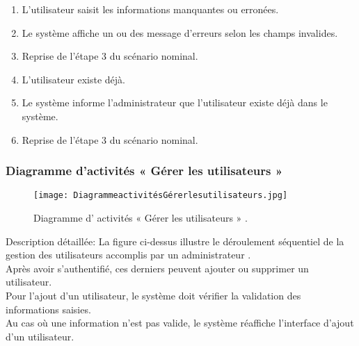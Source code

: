 \begin{itemize}
\begin{itemize}
		\begin{enumerate}
			\item L’utilisateur saisit les informations manquantes ou erronées.
			\item Le système affiche un ou des message d’erreurs selon les champs invalides.
			\item Reprise de l’étape 3 du scénario nominal.
			\item L’utilisateur existe déjà.
			\item Le système informe l’administrateur que l’utilisateur existe déjà dans le système.
			\item Reprise de l’étape 3 du scénario nominal.
		\end{enumerate}
	\end{itemize}
\end{itemize}	
\bigskip
\clearpage

\subsubsection{Diagramme d’activités « Gérer les utilisateurs » }
\begin{figure}[ht]
	\centering
	\texttt{[image: DiagrammeactivitésGérerlesutilisateurs.jpg]}
	\caption{Diagramme d' activités  « Gérer les utilisateurs »  .}
	\label{fig:Diagramme d' activités  Gérer les utilisateurs  }
\end{figure}
\FloatBarrier

{\Large \color{cyan} Description détaillée:}
La figure ci-dessus illustre le déroulement séquentiel de la gestion des utilisateurs accomplis par
un administrateur .\\
Après avoir s’authentifié, ces derniers peuvent ajouter ou supprimer un utilisateur.\\
Pour l’ajout d’un utilisateur, le système doit vérifier la validation des informations saisies.\\
 Au cas où une information n’est pas valide, le système réaffiche l’interface d’ajout d’un utilisateur.
 
